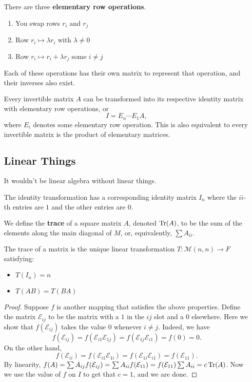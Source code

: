 \begin{df}
There are three \textbf{elementary row operations}.
\begin{enumerate}
\item You swap rows $r_i$ and $r_j$
\item Row $r_i \mapsto \lambda r_i$ with $\lambda \neq 0$
\item Row $r_i \mapsto r_i + \lambda r_j$ some $i \neq j$
\end{enumerate}
Each of these operations has their own matrix to represent that
operation, and their inverses also exist.
\end{df}

\begin{prop}
Every invertible matrix $A$ can be transformed into its respective
identity matrix with elementary row operations, or
\[ I = E_n \cdots E_1 A, \]
where $E_i$ denotes some elementary row operation. This is also
equivalent to every invertible matrix is the product of elementary
matrices.
\end{prop}

\subsection{Linear Things}
It wouldn't be linear algebra without linear things.
\begin{df}
The identity transformation has a corresponding identity matrix $I_n$
where the $ii$-th entries are $1$ and the other entries are $0$.
\end{df}

\begin{df}
We define the \textbf{trace} of a square matrix $A$, denoted $\operatorname{Tr}(A)$,
to be the sum of the elements along the main diagonal of $M$, or,
equivalently, $\sum A_{ii}$.
\end{df}

\begin{prop}
The trace of a matrix is the unique linear transformation $T :
\mathcal{M}(n, n) \rightarrow F$ satisfying:
\begin{itemize}
\item $T(I_n) = n$
\item $T(AB) = T(BA)$
\end{itemize}
\end{prop}

\begin{proof}
Suppose $f$ is another mapping that satisfies the above properties.
Define the matrix $\mathcal{E}_{ij}$ to be the matrix with a $1$ in the
$ij$ slot and a $0$ elsewhere. Here we show that $f(\mathcal{E}_{ij})$
takes the value $0$ whenever $i \neq j$. Indeed, we have
\[ f(\mathcal{E}_{ij}) = f(\mathcal{E}_{i1} \mathcal{E}_{1j}) =
f(\mathcal{E}_{1j} \mathcal{E}_{i1}) = f(0) = 0. \]
On the other hand,
\[ f(\mathcal{E}_{ii}) = f(\mathcal{E}_{i1} \mathcal{E}_{1i}) =
f(\mathcal{E}_{1i} \mathcal{E}_{i1}) = f(\mathcal{E}_{11}). \]
By linearity, $f(A) = \sum A_{ij} f(\mathcal{E}_{ij}) = \sum A_{ii}
f(\mathcal{E}_{11}) = f(\mathcal{E}_{11}) \sum A_{ii} = c \operatorname{Tr}(A)$. Now
we use the value of $f$ on $I$ to get that $c = 1$, and we are done.
\end{proof}

